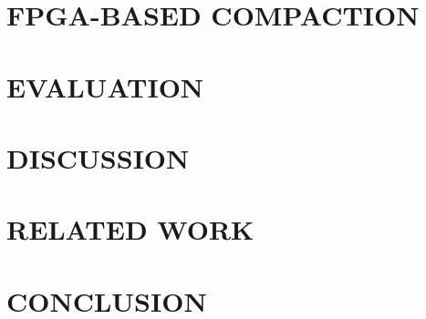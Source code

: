 \documentclass{vldb}
\begin{document}
\section{FPGA-BASED COMPACTION}

\section{EVALUATION}

\section{DISCUSSION}

\section{RELATED WORK}

\section{CONCLUSION}


\balance





\end{document}
